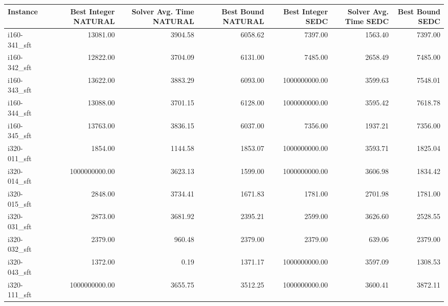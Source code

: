 \begin{tabular}{lrrrrrr}
\toprule
Instance &  Best Integer NATURAL &  Solver Avg. Time NATURAL &  Best Bound NATURAL &  Best Integer SEDC &  Solver Avg. Time SEDC &  Best Bound SEDC \\
\midrule
i160-341\_sft &              13081.00 &                   3904.58 &             6058.62 &            7397.00 &                1563.40 &          7397.00 \\
i160-342\_sft &              12822.00 &                   3704.09 &             6131.00 &            7485.00 &                2658.49 &          7485.00 \\
i160-343\_sft &              13622.00 &                   3883.29 &             6093.00 &      1000000000.00 &                3599.63 &          7548.01 \\
i160-344\_sft &              13088.00 &                   3701.15 &             6128.00 &      1000000000.00 &                3595.42 &          7618.78 \\
i160-345\_sft &              13763.00 &                   3836.15 &             6037.00 &            7356.00 &                1937.21 &          7356.00 \\
i320-011\_sft &               1854.00 &                   1144.58 &             1853.07 &      1000000000.00 &                3593.71 &          1825.04 \\
i320-014\_sft &         1000000000.00 &                   3623.13 &             1599.00 &      1000000000.00 &                3606.98 &          1834.42 \\
i320-015\_sft &               2848.00 &                   3734.41 &             1671.83 &            1781.00 &                2701.98 &          1781.00 \\
i320-031\_sft &               2873.00 &                   3681.92 &             2395.21 &            2599.00 &                3626.60 &          2528.55 \\
i320-032\_sft &               2379.00 &                    960.48 &             2379.00 &            2379.00 &                 639.06 &          2379.00 \\
i320-043\_sft &               1372.00 &                      0.19 &             1371.17 &      1000000000.00 &                3597.09 &          1308.53 \\
i320-111\_sft &         1000000000.00 &                   3655.75 &             3512.25 &      1000000000.00 &                3600.41 &          3872.11 \\

\end{tabular}
